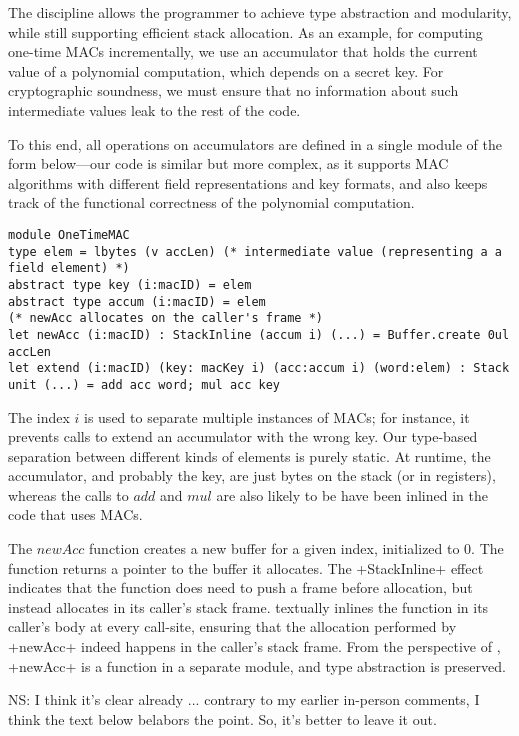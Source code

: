 The \lowstar discipline allows the programmer to achieve type abstraction and
modularity, while still supporting efficient stack allocation.
As an example, for computing one-time MACs incrementally, we use an accumulator
that holds the current value of a polynomial computation, which depends on a
secret key.  For cryptographic soundness, we must ensure that no information
about such intermediate values leak to the rest of the code.

To this end, all operations on accumulators are defined in a single
module of the form below---our code is similar but more complex, as it
supports MAC algorithms with different field representations and key
formats, and also keeps track of the functional correctness of the
polynomial computation.

\begin{lstlisting}[numbers=none]
module OneTimeMAC
type elem = lbytes (v accLen) (* intermediate value (representing a a field element) *) 
abstract type key (i:macID) = elem
abstract type accum (i:macID) = elem
(* newAcc allocates on the caller's frame *)
let newAcc (i:macID) : StackInline (accum i) (...) = Buffer.create 0ul accLen 
let extend (i:macID) (key: macKey i) (acc:accum i) (word:elem) : Stack unit (...) = add acc word; mul acc key
\end{lstlisting}

The index \lst$i$ is used to separate multiple instances of MACs; for
instance, it prevents calls to extend an accumulator with the wrong
key. Our type-based separation between different kinds of elements is
purely static. At runtime, the accumulator, and probably the key, are
just bytes on the stack (or in registers), whereas the calls to
\lst$add$ and \lst$mul$ are also likely to be have been inlined in the
code that uses MACs.

The \lst$newAcc$ function creates a new buffer for a given index, initialized to
0. The function returns a pointer to the buffer it allocates. The
\li+StackInline+ effect indicates that the function does need to push a frame
before allocation, but instead allocates in its caller's stack frame.
%
\kremlin textually inlines the function in its caller's body at every
call-site, ensuring that the allocation performed by \li+newAcc+
indeed happens in the caller's stack frame.
%
From the perspective of \lowstar, \li+newAcc+ is a function in a
separate module, and type abstraction is preserved.

\iffalse
NS: I think it's clear already ... contrary to my earlier in-person comments,
    I think the text below belabors the point. So, it's better to leave it out.

